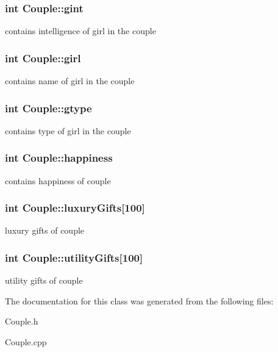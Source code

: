 \subsubsection[{\texorpdfstring{gint}{gint}}]{\setlength{\rightskip}{0pt plus 5cm}int Couple\+::gint}\hypertarget{classCouple_ac8f2a31c9fd86ef6077035f46cc3b6d6}{}\label{classCouple_ac8f2a31c9fd86ef6077035f46cc3b6d6}
contains intelligence of girl in the couple 
\subsubsection[{\texorpdfstring{girl}{girl}}]{\setlength{\rightskip}{0pt plus 5cm}int Couple\+::girl}\hypertarget{classCouple_a2e5c780d063c6b1d78121944cb8f054b}{}\label{classCouple_a2e5c780d063c6b1d78121944cb8f054b}
contains name of girl in the couple 
\subsubsection[{\texorpdfstring{gtype}{gtype}}]{\setlength{\rightskip}{0pt plus 5cm}int Couple\+::gtype}\hypertarget{classCouple_a1758d09993933c65563470d90f63a47d}{}\label{classCouple_a1758d09993933c65563470d90f63a47d}
contains type of girl in the couple 
\subsubsection[{\texorpdfstring{happiness}{happiness}}]{\setlength{\rightskip}{0pt plus 5cm}int Couple\+::happiness}\hypertarget{classCouple_aee78d616688f0cccff84e1c23cb31f7a}{}\label{classCouple_aee78d616688f0cccff84e1c23cb31f7a}
contains happiness of couple 
\subsubsection[{\texorpdfstring{luxury\+Gifts}{luxuryGifts}}]{\setlength{\rightskip}{0pt plus 5cm}int Couple\+::luxury\+Gifts\mbox{[}100\mbox{]}}\hypertarget{classCouple_a7b672637b9c901e1ffcbd27e13a7a57a}{}\label{classCouple_a7b672637b9c901e1ffcbd27e13a7a57a}
luxury gifts of couple 
\subsubsection[{\texorpdfstring{utility\+Gifts}{utilityGifts}}]{\setlength{\rightskip}{0pt plus 5cm}int Couple\+::utility\+Gifts\mbox{[}100\mbox{]}}\hypertarget{classCouple_ab88c6aeb8added9e52bd824e1cacb044}{}\label{classCouple_ab88c6aeb8added9e52bd824e1cacb044}
utility gifts of couple 

The documentation for this class was generated from the following files\+:\begin{DoxyCompactItemize}
\item 
Couple.\+h\item 
Couple.\+cpp\end{DoxyCompactItemize}
